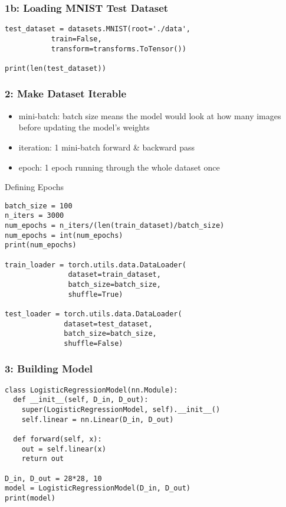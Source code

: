 \documentclass[14 pt]{beamer}
\let\olditem\item
\renewcommand{\item}{\olditem\vspace{4pt}}
\begin{document}
\begin{frame}[fragile]
  \frametitle{1b: Loading MNIST Test Dataset}
  \begin{block}{}
\begin{verbatim}
test_dataset = datasets.MNIST(root='./data', 
           train=False, 
           transform=transforms.ToTensor())

print(len(test_dataset))
\end{verbatim}
  \end{block}
\end{frame}

\begin{frame}
  \frametitle{2: Make Dataset Iterable}
  \begin{itemize}
  \item mini-batch: batch size means the model would look at how many
    images before updating the model's weights
  \item iteration: 1 mini-batch forward \& backward pass
  \item epoch: 1 epoch  running through the whole dataset once
  \end{itemize}
\end{frame}

\begin{frame}[fragile]{Defining Epochs}
\small{
  \begin{block}{}
\begin{verbatim}
batch_size = 100
n_iters = 3000
num_epochs = n_iters/(len(train_dataset)/batch_size)
num_epochs = int(num_epochs)
print(num_epochs)

train_loader = torch.utils.data.DataLoader(
               dataset=train_dataset, 
               batch_size=batch_size, 
               shuffle=True)

test_loader = torch.utils.data.DataLoader(
              dataset=test_dataset, 
              batch_size=batch_size, 
              shuffle=False)
\end{verbatim}
  \end{block}
}
\end{frame}

\begin{frame}[fragile]
  \frametitle{3: Building Model}
\small{
  \begin{block}{}
\begin{verbatim}
class LogisticRegressionModel(nn.Module):
  def __init__(self, D_in, D_out):
    super(LogisticRegressionModel, self).__init__()
    self.linear = nn.Linear(D_in, D_out)

  def forward(self, x):
    out = self.linear(x)
    return out

D_in, D_out = 28*28, 10
model = LogisticRegressionModel(D_in, D_out)
print(model)
\end{verbatim}
  \end{block}
}
\end{frame}
\end{document}
